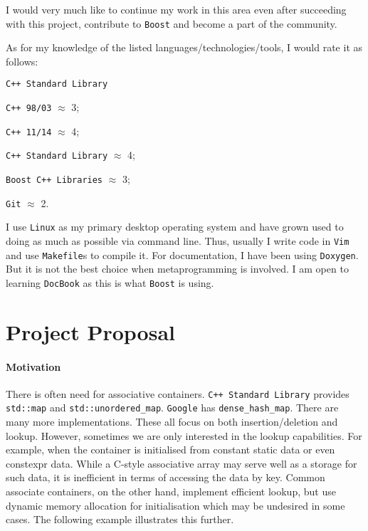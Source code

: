 \documentclass[a4paper,12pt]{article}
\begin{document}
    I would very much like to continue my work in this area even after succeeding with this project, contribute to \texttt{Boost} and become a part of the community.

    As for my knowledge of the listed languages/technologies/tools, I would rate it as follows:
    \begin{labeling}{\texttt{C++ Standard Library}}
    \item [\texttt{C++ 98/03}] $\approx$ 3;
    \item [\texttt{C++ 11/14}] $\approx$ 4;
    \item [\texttt{C++ Standard Library}] $\approx$ 4;
    \item [\texttt{Boost C++ Libraries}] $\approx$ 3;
    \item [\texttt{Git}] $\approx$ 2.
    \end{labeling}

    I use \texttt{Linux} as my primary desktop operating system and have grown used to doing as much as possible via command line. Thus, usually I write code in \texttt{Vim} and use \texttt{Makefile}s to compile it. For documentation, I have been using \texttt{Doxygen}. But it is not the best choice when metaprogramming is involved. I am open to learning \texttt{DocBook} as this is what \texttt{Boost} is using.

\section{Project Proposal}
   
    \paragraph{Motivation} There is often need for associative containers. \texttt{C++ Standard Library} provides \texttt{std::map} and \texttt{std::unordered\_map}. \texttt{Google} has \texttt{dense\_hash\_map}. There are many more implementations. These all focus on both insertion/deletion and lookup. However, sometimes we are only interested in the lookup capabilities. For example, when the container is initialised from constant static data or even constexpr data. While a C-style associative array may serve well as a storage for such data, it is inefficient in terms of accessing the data by key. Common associate containers, on the other hand, implement efficient lookup, but use dynamic memory allocation for initialisation which may be undesired in some cases. The following example illustrates this further.
\end{document}
